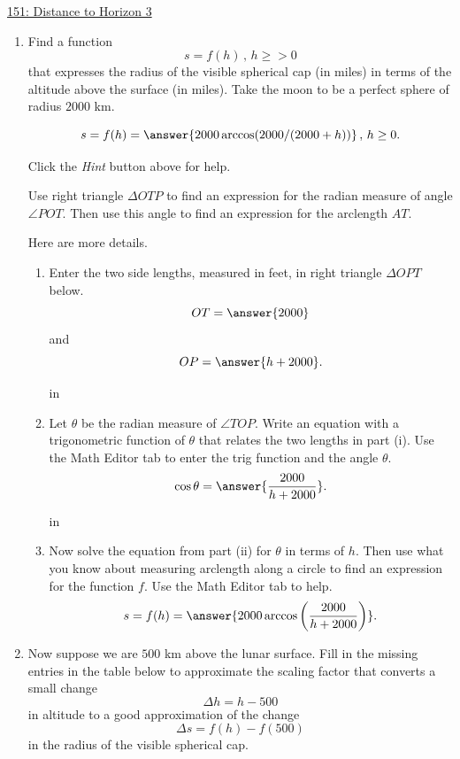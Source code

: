 \documentclass{ximera}
\newcommand{\pskip}{\vskip 0.1 in}
\begin{document}
\begin{question}
\href{https://www.desmos.com/calculator/url0dnbaii}{151: Distance to Horizon 3}



\begin{enumerate}

\item Find a function
\[
       s = f(h) \, , \, h \geq >0
\]
that expresses the radius of the visible spherical cap (in miles) in terms of the altitude above the surface (in miles). Take the moon to be a perfect sphere of radius $2000$ km.

\[
     s = f(h) = \answer{2000\arccos(2000/(2000+h))} \, , \, h \geq 0.
\]

Click the \emph{Hint} button above for help.
\begin{hint}
Use right triangle $\Delta OTP$ to find an expression for the radian measure of angle $\angle POT$. Then use this angle to find an expression for the arclength $AT$.

Here are more details.

\begin{enumerate}

\item  Enter the two side lengths, measured in feet, in right triangle $\Delta OPT$ below.
\[
      OT = \answer{2000}
\]
and
\[
        OP = \answer{h+2000} .
\]

\pskip

\item Let $\theta$ be the radian measure of $\angle TOP$. Write an equation with a trigonometric function of $\theta$ that relates the two lengths in part (i). Use the Math Editor tab to enter the trig function and the angle $\theta$.
\[
     \cos \theta = \answer{\frac{2000}{h+2000}}.
\]

\pskip

\item Now solve the equation from part (ii) for $\theta$ in terms of $h$. Then use what you know about measuring arclength along a circle to find an expression for the function $f$. Use the Math Editor tab to help.
\[
      s = f(h) = \answer{2000 \arccos \left( \frac{2000}{h+2000}\right)} .
\]
\end{enumerate}
\end{hint}




\item Now suppose we are $500$ km above the lunar surface. Fill in the missing entries in the table below to approximate the scaling factor that converts a small change 
\[
  \Delta h = h - 500
\]
in altitude to a good approximation of the change
\[
  \Delta s = f(h) - f(500)
\]
in the radius of the visible spherical cap.


\end{enumerate}
\end{question}
\end{document}
